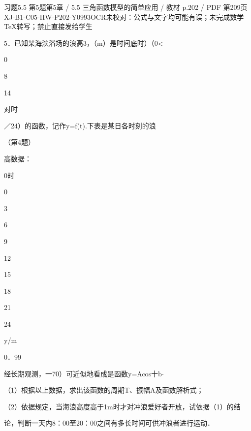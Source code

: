 \begin{bankitem}{习题5.5 第5题}{第5章 / 5.5 三角函数模型的简单应用 / 教材 p.202 / PDF 第209页}{XJ-B1-C05-HW-P202-Y0993}{OCR未校对：公式与文字均可能有误；未完成数学TeX转写；禁止直接发给学生}
\begin{ocrdraft}
\par
5．已知某海滨浴场的浪高3，（m）是时间底时）（0<
\par
0
\par
8
\par
14
\par
对时
\par
／24）的函数，记作y=f(t).下表是某日各时刻的浪
\par
（第4题）
\par
高数据：
\par
0时
\par
0
\par
3
\par
6
\par
9
\par
12
\par
15
\par
18
\par
21
\par
24
\par
y/m
\par
0．99
\par
经长期观测，一70）可近似地看成是函数y=Acos十b\ensuremath{\cdot}
\par
（1）根据以上数据，求出该函数的周期T、振幅A及函数解析式；
\par
（2）依据规定，当海浪高度高于1m时才对冲浪爱好者开放，试依据（1）的结
\par
论，判断一天内8：00至20：00之间有多长时间可供冲浪者进行运动．
\end{ocrdraft}
\end{bankitem}
